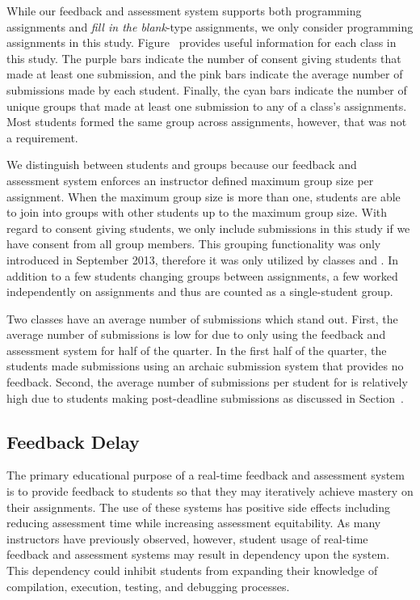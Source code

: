 While our feedback and assessment system supports both programming assignments
and \emph{fill in the blank}-type assignments, we only consider programming
assignments in this study. Figure~ provides useful
information for each class in this study. The purple bars indicate the number
of consent giving students that made at least one submission, and the pink bars
indicate the average number of submissions made by each student. Finally, the
cyan bars indicate the number of unique groups that made at least one
submission to any of a class's assignments. Most students formed the same group
across assignments, however, that was not a requirement.

We distinguish between students and groups because our feedback and assessment
system enforces an instructor defined maximum group size per assignment. When
the maximum group size is more than one, students are able to join into groups
with other students up to the maximum group size. With regard to consent giving
students, we only include submissions in this study if we have consent from all
group members. This grouping functionality was only introduced in September
2013, therefore it was only utilized by classes  and . In
addition to a few students changing groups between assignments, a few worked
independently on assignments and thus are counted as a single-student group.

Two classes have an average number of submissions which stand out. First, the
average number of submissions is low for  due to only using the
feedback and assessment system for half of the quarter. In the first half of
the quarter, the students made submissions using an archaic submission system
that provides no feedback. Second, the average number of submissions per
student for  is relatively high due to students making post-deadline
submissions as discussed in Section~.


\subsection{Feedback Delay} 
The primary educational purpose of a real-time feedback and assessment system
is to provide feedback to students so that they may iteratively achieve mastery
on their assignments. The use of these systems has positive side effects
including reducing assessment time while increasing assessment equitability. As
many instructors have previously observed, however, student usage of real-time
feedback and assessment systems may result in dependency upon the system. This
dependency could inhibit students from expanding their knowledge of
compilation, execution, testing, and debugging processes.

